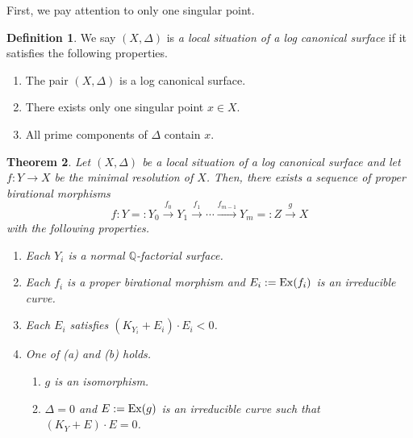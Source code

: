 \documentclass[12pt,twoside]{amsart}
\newtheorem{thm}{Theorem}[section]
\theoremstyle{definition}
\newtheorem{dfn}[thm]{Definition}
\newcommand{\Q}{$\mathbb{Q}$}
\begin{document}
First, we pay attention to only one singular point. 


\begin{dfn}
We say $(X, \Delta)$ is {\em a local situation of a log canonical surface} if 
it satisfies the following properties. 
\begin{enumerate}
\item{The pair $(X, \Delta)$ is a log canonical surface.}
\item{There exists only one singular point $x\in X$.}
\item{All prime components of $\Delta$ contain $x$.}
\end{enumerate}
\end{dfn}


\begin{thm}\label{lcgermsing}
Let $(X, \Delta)$ be a local situation of a log canonical surface and 
let $f:Y \to X$ be the minimal resolution of $X$. 
Then, there exists a sequence of proper birational morphisms 
$$
f:Y=:Y_0\overset{f_0}\to Y_1\overset{f_1}\to \cdots 
\overset{f_{m-1}}\to Y_m=:Z\overset{g}\to X 
$$
with the following properties. 
\begin{enumerate}
\item[(1)]{Each $Y_i$ is a normal \Q-factorial surface.}
\item[(2)]{Each $f_i$ is a proper birational morphism and 
$E_i:={\rm Ex}(f_i)$ is an irreducible curve.}
\item[(3)]{Each $E_i$ satisfies $(K_{Y_i}+E_i)\cdot E_i<0$.}
\item[(4)]{One of {\em{(a)}} and {\em{(b)}} holds. 
\begin{enumerate}
\item[(a)]{$g$ is an isomorphism.}
\item[(b)]{$\Delta=0$ and $E:={\rm Ex}(g)$ is an irreducible curve such that $(K_Y+E)\cdot E=0$.}
\end{enumerate}}\end{enumerate}
\end{thm}
\end{document}

